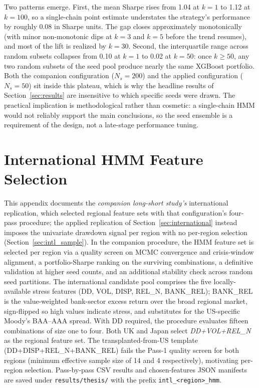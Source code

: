 

Two patterns emerge. First, the mean Sharpe rises from 1.04 at $k = 1$ to 1.12 at $k = 100$, so a single-chain point estimate understates the strategy's performance by roughly 0.08 in Sharpe units. The gap closes approximately monotonically (with minor non-monotonic dips at $k = 3$ and $k = 5$ before the trend resumes), and most of the lift is realized by $k = 30$. Second, the interquartile range across random subsets collapses from 0.10 at $k = 1$ to 0.02 at $k = 50$: once $k \geq 50$, any two random subsets of the seed pool produce nearly the same XGBoost portfolio. Both the companion configuration ($N_s = 200$) and the applied configuration ($N_s = 50$) sit inside this plateau, which is why the headline results of Section~\ref{sec:results} are insensitive to which specific seeds were drawn. The practical implication is methodological rather than cosmetic: a single-chain HMM would not reliably support the main conclusions, so the seed ensemble is a requirement of the design, not a late-stage performance tuning.

\section{International HMM Feature Selection}\label{app:intl_feature_selection}

\sloppy
This appendix documents the \emph{companion long-short study's} international replication, which selected regional feature sets with that configuration's four-pass procedure; the applied replication of Section~\ref{sec:international} instead imposes the univariate drawdown signal per region with no per-region selection (Section~\ref{sec:intl_sample}). In the companion procedure, the HMM feature set is selected per region via a quality screen on MCMC convergence and crisis-window alignment, a portfolio-Sharpe ranking on the surviving combinations, a definitive validation at higher seed counts, and an additional stability check across random seed partitions. The international candidate pool comprises the five locally-available stress features (DD, VOL, DISP, REL\_N, BANK\_REL); BANK\_REL is the value-weighted bank-sector excess return over the broad regional market, sign-flipped so high values indicate stress, and substitutes for the US-specific Moody's BAA--AAA spread. With DD required, the procedure evaluates fifteen combinations of size one to four. Both UK and Japan select \emph{DD+VOL+REL\_N} as the regional feature set. The transplanted-from-US template (DD+DISP+REL\_N+BANK\_REL) fails the Pass-1 quality screen for both regions (minimum effective sample size of 14 and 4 respectively), motivating per-region selection. Pass-by-pass CSV results and chosen-features JSON manifests are saved under \texttt{results/thesis/} with the prefix \texttt{intl\_<region>\_hmm}.

